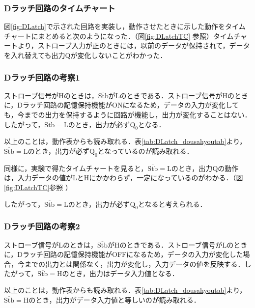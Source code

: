%
%
\subsubsection{Dラッチ回路のタイムチャート}
\label{DLatch_timechart}
図\ref{fig:DLatch}で示された回路を実装し，動作させたときに示した動作をタイムチャートにまとめると次のようになった．（図\ref{fig:DLatchTC} 参照）タイムチャートより，ストローブ入力が正のときには，以前のデータが保持されて，データを入れ替えても出力Qが変化しないことがわかった．

%
%
\subsubsection{Dラッチ回路の考察1}
\label{DLatch_consideration1}
ストローブ信号がHのときは，$\overline{\mathrm{Stb}}$がLのときである．ストローブ信号がHのときに，Dラッチ回路の記憶保持機能がONになるため，データの入力が変化しても，今までの出力を保持するように回路が機能し，出力が変化することはない．したがって，$\overline{\mathrm{Stb}}=\mathrm{L}$のとき，出力が必ず$\mathrm{Q_0}$となる．

以上のことは，動作表からも読み取れる．表\ref{tab:DLatch_dousahyoutab}より，$\overline{\mathrm{Stb}}=\mathrm{L}$のとき，出力が必ず$\mathrm{Q_0}$となっているのが読み取れる．

同様に，実験で得たタイムチャートを見ると，$\overline{\mathrm{Stb}}=\mathrm{L}$のとき，出力$\mathrm{Q}$の動作は，入力データの値がLとHにかかわらず，一定になっているのがわかる．（図\ref{fig:DLatchTC}参照 ）

したがって，$\overline{\mathrm{Stb}}=\mathrm{L}$のとき，出力が必ず$\mathrm{Q_0}$となると考えられる．

%
%
\subsubsection{Dラッチ回路の考察2}
\label{DLatch_consideration2}
ストローブ信号がLのときは，$\overline{\mathrm{Stb}}$がHのときである．ストローブ信号がLのときに，Dラッチ回路の記憶保持機能がOFFになるため，データの入力が変化した場合，今までの出力とは関係なく，出力が変化し，入力データの値を反映する．したがって，$\overline{\mathrm{Stb}}=\mathrm{H}$のとき，出力はデータ入力値となる．

以上のことは，動作表からも読み取れる．表\ref{tab:DLatch_dousahyoutab}より，$\overline{\mathrm{Stb}}=\mathrm{H}$のとき，出力がデータ入力値と等しいのが読み取れる．

